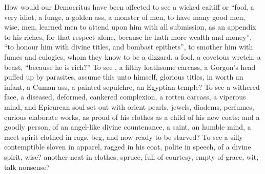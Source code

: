 How would our Democritus have been affected to see a wicked caitiff or
\enquote{fool, a very idiot, a funge, a golden ass, a monster of
men, to have many good men, wise, men, learned men to attend upon him with all
submission, as an appendix to his riches, for that respect alone, because he
hath more wealth and money}, \enquote{to honour him with divine
titles, and bombast epithets}, to smother him with fumes and eulogies, whom
they know to be a dizzard, a fool, a covetous wretch, a beast, \etc{} \enquote{because
he is rich?} To see , a filthy loathsome
carcass, a Gorgon's head puffed up by parasites, assume this unto himself,
glorious titles, in worth an infant, a Cuman ass, a painted sepulchre, an
Egyptian temple? To see a withered face, a diseased, deformed, cankered
complexion, a rotten carcass, a viperous mind, and Epicurean soul set out with
orient pearls, jewels, diadems, perfumes, curious elaborate works, as proud of
his clothes as a child of his new coats; and a goodly person, of an angel-like
divine countenance, a saint, an humble mind, a meet spirit clothed in rags,
beg, and now ready to be starved? To see a silly contemptible sloven in
apparel, ragged in his coat, polite in speech, of a divine spirit, wise?
another neat in clothes, spruce, full of courtesy, empty of grace, wit, talk
nonsense?

